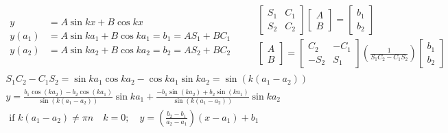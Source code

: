 \documentclass[twoside]{amsart}
\theoremstyle{plain}
\theoremstyle{definition}
\begin{document}
\begin{enumerate}
\[\begin{gathered}
\begin{aligned}
    y & = A \sin{kx} + B \cos{kx} \\
    y(a_1) & = A \sin{ka_1} + B \cos{ka_1} = b_1 = AS_1 + BC_1 \\
    y(a_2) & = A \sin{ka_2} + B \cos{ka_2} = b_2 = AS_2 + BC_2 
  \end{aligned} \quad \, 
\begin{aligned}
  & \left[ \begin{matrix} S_1 & C_1 \\ S_2 & C_2 \end{matrix} \right] \left[ \begin{matrix} A \\ B \end{matrix} \right] = \left[ \begin{matrix} b_1 \\ b_2 \end{matrix} \right] \\
  & \left[ \begin{matrix} A \\ B \end{matrix} \right] = \left[ \begin{matrix} C_2 & -C_1 \\ -S_2 & S_1 \end{matrix} \right] \left( \frac{1}{ S_1 C_2 - C_1 S_2 } \right) \left[ \begin{matrix} b_1 \\ b_2 \end{matrix} \right] 
\end{aligned} \\
S_1 C_2 - C_1 S_2 = \sin{ka_1} \cos{ka_2} - \cos{ka_1} \sin{ka_2} = \sin{(k(a_1 - a_2 )) } \\
y = \frac{ b_1 \cos{ (ka_2) } - b_2 \cos{ (ka_1) } }{ \sin{ (k (a_1 - a_2 ) ) } } \sin{ka_1 } + \frac{ -b_1 \sin{(ka_2) } + b_2 \sin{(ka_1) } }{ \sin{ (k (a_1 -a_2) ) } } \sin{ka_2} \\
\text{ if } k(a_1 - a_2 ) \neq \pi n \quad k = 0 ; \quad \boxed{ y  = \left( \frac{ b_2 - b_1 }{ a_2 - a_1 } \right) (x-a_1) + b_1 }
\end{gathered}
\]
\end{enumerate}
\end{document}
